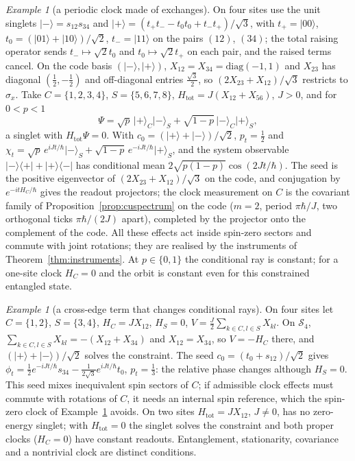 \documentclass[aps,pra,onecolumn,superscriptaddress,nofootinbib,10pt]{revtex4-2}
\theoremstyle{definition}
\theoremstyle{remark}
\newtheorem{example}[theorem]{Example}
\begin{document}
\begin{example}[a periodic clock made of exchanges]\label{ex:cueight}
On four sites use the unit singlets $\lvert-\rangle=s_{12}s_{34}$ and $\lvert+\rangle=(t_+t_--t_0t_0+t_-t_+)/\sqrt3$, with $t_+=\lvert00\rangle$,
$t_0=(\lvert01\rangle+\lvert10\rangle)/\sqrt2$, $t_-=\lvert11\rangle$ on the pairs $(12)$, $(34)$; the total raising operator sends $t_-\mapsto\sqrt2t_0$ and
$t_0\mapsto\sqrt2t_+$ on each pair, and the raised terms cancel.  On the code basis $(\lvert-\rangle,\lvert+\rangle)$, $X_{12}=X_{34}=\mathrm{diag}(-1,1)$ and $X_{23}$ has
diagonal $(\tfrac12,-\tfrac12)$ and off-diagonal entries $\tfrac{\sqrt3}2$, so $(2X_{23}+X_{12})/\sqrt3$ restricts to $\sigma_x$.  Take $C=\{1,2,3,4\}$,
$S=\{5,6,7,8\}$, $H_{\mathrm{tot}}=J(X_{12}+X_{56})$, $J>0$, and for $0<p<1$
\[
\Psi=\sqrt p\,\lvert+\rangle_C\lvert-\rangle_S+\sqrt{1-p}\,\lvert-\rangle_C\lvert+\rangle_S ,
\]
a singlet with $H_{\mathrm{tot}}\Psi=0$.  With $c_0=(\lvert+\rangle+\lvert-\rangle)/\sqrt2$, $p_t=\tfrac12$ and $\chi_t=\sqrt p\,e^{iJt/\hbar}\lvert-\rangle_S+\sqrt{1-p}\,e^{-iJt/\hbar}\lvert+\rangle_S$, and the system
observable $\lvert-\rangle\langle+\rvert+\lvert+\rangle\langle-\rvert$ has conditional mean $2\sqrt{p(1-p)}\cos(2Jt/\hbar)$.  The seed is the positive eigenvector of
$(2X_{23}+X_{12})/\sqrt3$ on the code, and conjugation by $e^{-itH_C/\hbar}$ gives the readout projectors; the clock
measurement on $C$ is the covariant family of Proposition~\ref{prop:cuspectrum} on the code ($m=2$, period $\pi\hbar/J$, two
orthogonal ticks $\pi\hbar/(2J)$ apart), completed by the projector onto the complement of the code.  All these
effects act inside spin-zero sectors and commute with joint rotations; they are realised by the
instruments of Theorem~\ref{thm:instruments}.  At $p\in\{0,1\}$ the conditional ray is constant; for a one-site clock $H_C=0$
and the orbit is constant even for this constrained entangled state.
\end{example}

\begin{example}[a cross-edge term that changes conditional rays]\label{ex:cucross}
On four sites let $C=\{1,2\}$, $S=\{3,4\}$, $H_C=JX_{12}$, $H_S=0$, $V=\tfrac J2\sum_{k\in C,l\in S}X_{kl}$.  On $\mathcal S_4$, $\sum_{k\in C,l\in S}X_{kl}=-(X_{12}+X_{34})$ and
$X_{12}=X_{34}$, so $V=-H_C$ there, and $(\lvert+\rangle+\lvert-\rangle)/\sqrt2$ solves the constraint.  The seed $c_0=(t_0+s_{12})/\sqrt2$ gives
$\phi_t=\tfrac12e^{-iJt/\hbar}s_{34}-\tfrac1{2\sqrt3}e^{iJt/\hbar}t_0$, $p_t=\tfrac13$: the relative phase changes although $H_S=0$.  This seed mixes inequivalent
spin sectors of $C$; if admissible clock effects must commute with rotations of $C$, it needs an internal
spin reference, which the spin-zero clock of Example~\ref{ex:cueight} avoids.  On two sites $H_{\mathrm{tot}}=JX_{12}$, $J\ne0$, has no
zero-energy singlet; with $H_{\mathrm{tot}}=0$ the singlet solves the constraint and both proper clocks ($H_C=0$) have constant
readouts.  Entanglement, stationarity, covariance and a nontrivial clock are distinct conditions.
\end{example}
\end{document}
